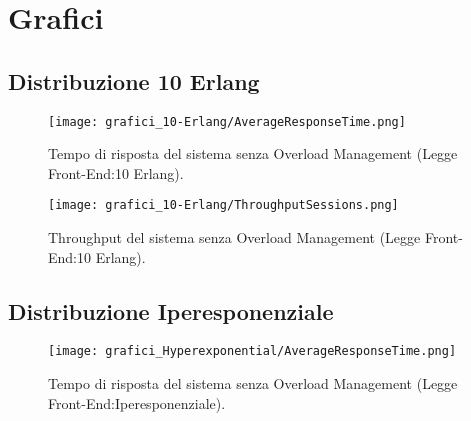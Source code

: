 \chapter{Grafici} 
\label{appendix:grafici}
\section{Distribuzione 10 Erlang}
\begin{figure}[H]
	\begin{center}
	\texttt{[image: grafici\_10-Erlang/AverageResponseTime.png]}
	\caption[Tempo di risposta del sistema senza Overload Management (Legge Front-End:10 Erlang)]{Tempo di risposta del sistema senza Overload Management (Legge Front-End:10 Erlang).}
	\label{fig:exp_res_time}
	\end{center}
\end{figure}

\begin{figure}[H]
	\begin{center}
	\texttt{[image: grafici\_10-Erlang/ThroughputSessions.png]}
	\caption[Throughput del sistema senza Overload Management (Legge Front-End:10 Erlang)]{Throughput del sistema senza Overload Management (Legge Front-End:10 Erlang).}
	\label{fig:exp_res_time}
	\end{center}
\end{figure}
\section{Distribuzione Iperesponenziale}
\begin{figure}[H]
	\begin{center}
	\texttt{[image: grafici\_Hyperexponential/AverageResponseTime.png]}
	\caption[Tempo di risposta del sistema senza Overload Management (Legge Front-End:Iperesponenziale)]{Tempo di risposta del sistema senza Overload Management (Legge Front-End:Iperesponenziale).}
	\label{fig:exp_res_time}
	\end{center}
\end{figure}

